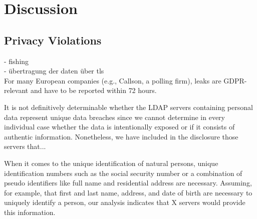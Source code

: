 \section{Discussion}
\label{sec:discussion}


\subsection{Privacy Violations}
- fishing \\
- übertragung der daten über tls \\


For many European companies (e.g., Callson, a polling firm), leaks are GDPR-relevant and have to be reported within 72 hours. 

It is not definitively determinable whether the LDAP servers containing personal data represent unique data breaches since we cannot determine in every individual case whether the data is intentionally exposed or if it consists of authentic information. Nonetheless, we have included in the disclosure those servers that...

When it comes to the unique identification of natural persons, unique identification numbers such as the social security number or a combination of pseudo identifiers like full name and residential address are necessary. Assuming, for example, that first and last name, address, and date of birth are necessary to uniquely identify a person, our analysis indicates that X servers would provide this information.

    
    

